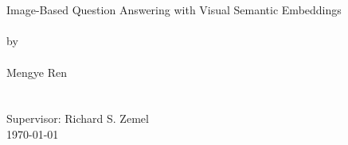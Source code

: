 \begin{titlepage}
\hfill\\
\hfill\\
\hfill\\
\hfill\\
\hfill\\
\hfill\\
\hfill\\
\begin{center}
\Large Image-Based Question Answering with Visual Semantic Embeddings\\
\hfill\\
\normalsize by\\
\hfill\\
Mengye Ren\\
\hfill\\
\hfill\\
Supervisor: Richard S. Zemel\\
\today
\end{center}
\vspace*{\fill}
\end{titlepage}
